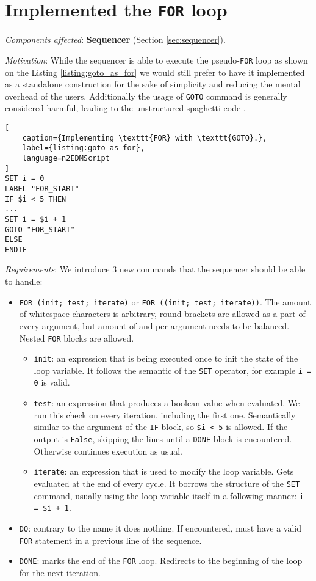 \section{Implemented the \texttt{FOR} loop}
\label{sec:for_loop}

\textit{Components affected}: \textbf{Sequencer} (Section \ref{sec:sequencer}).

\textit{Motivation}: While the sequencer is able to execute the pseudo-\texttt{FOR} loop as shown on the Listing \ref{listing:goto_as_for} we would still prefer to have it implemented as a standalone construction for the sake of simplicity and reducing the mental overhead of the users. Additionally the usage of \texttt{GOTO} command is generally considered \cite{Dijkstra1968} harmful, leading to the unstructured spaghetti code \cite{Cram2005}.

\begin{lstlisting}[
	caption={Implementing \texttt{FOR} with \texttt{GOTO}.}, 
	label={listing:goto_as_for}, 
	language=n2EDMScript
]
SET i = 0
LABEL "FOR_START"
IF $i < 5 THEN
...
SET i = $i + 1
GOTO "FOR_START"
ELSE
ENDIF
\end{lstlisting}

\textit{Requirements}: We introduce 3 new commands that the sequencer should be able to handle:

\begin{itemize}
	\item \texttt{FOR (init; test; iterate)} or \texttt{FOR ((init; test; iterate))}. The amount of whitespace characters is arbitrary, round brackets are allowed as a part of every argument, but amount of \highlight{(} and \highlight{)} per argument needs to be balanced. Nested \texttt{FOR} blocks are allowed.
	\begin{itemize}
		\item \texttt{init}: an expression that is being executed once to init the state of the loop variable. It follows the semantic of the \texttt{SET} operator, for example \texttt{i = 0} is valid.
		\item \texttt{test}: an expression that produces a boolean value when evaluated. We run this check on every iteration, including the first one. Semantically similar to the argument of the \texttt{IF} block, so \texttt{\$i < 5} is allowed. If the output is \texttt{False}, skipping the lines until a \texttt{DONE} block is encountered. Otherwise continues execution as usual.
		\item \texttt{iterate}: an expression that is used to modify the loop variable. Gets evaluated at the end of every cycle. It borrows the structure of the \texttt{SET} command, usually using the loop variable itself in a following manner: \texttt{i = \$i + 1}.
	\end{itemize}
	\item \texttt{DO}: contrary to the name it does nothing. If encountered, must have a valid \texttt{FOR} statement in a previous line of the sequence.
	\item \texttt{DONE}: marks the end of the \texttt{FOR} loop. Redirects to the beginning of the loop for the next iteration.
\end{itemize}

